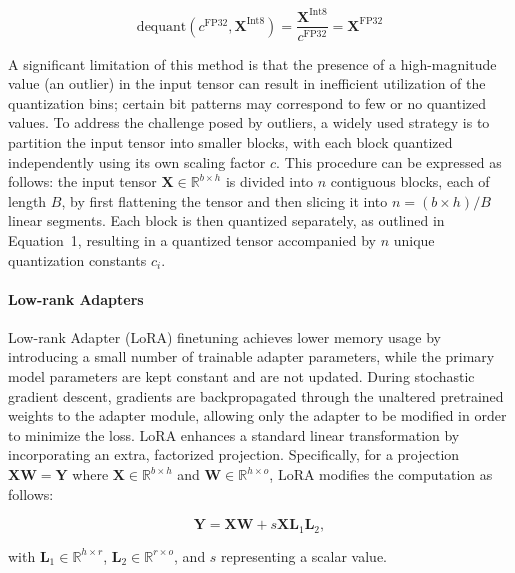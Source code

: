\begin{equation}
    \text{dequant}(c^{\text{FP32}}, \mathbf{X}^{\text{Int8}}) = \frac{\mathbf{X}^{\text{Int8}}}{c^{\text{FP32}}} = \mathbf{X}^{\text{FP32}}
\end{equation}

A significant limitation of this method is that the presence of a high-magnitude value (an outlier) in the input tensor can result in inefficient utilization of the quantization bins; certain bit patterns may correspond to few or no quantized values. To address the challenge posed by outliers, a widely used strategy is to partition the input tensor into smaller blocks, with each block quantized independently using its own scaling factor $c$. This procedure can be expressed as follows: the input tensor $\mathbf{X}\in \mathbb{R}^{b\times h}$ is divided into $n$ contiguous blocks, each of length $B$, by first flattening the tensor and then slicing it into ${n = ({b\times h} )/{B} }$ linear segments. Each block is then quantized separately, as outlined in Equation~1, resulting in a quantized tensor accompanied by $n$ unique quantization constants $c_i$.

\paragraph{Low-rank Adapters} Low-rank Adapter (LoRA) finetuning \citep{hu2021lora} achieves lower memory usage by introducing a small number of trainable adapter parameters, while the primary model parameters are kept constant and are not updated. During stochastic gradient descent, gradients are backpropagated through the unaltered pretrained weights to the adapter module, allowing only the adapter to be modified in order to minimize the loss. LoRA enhances a standard linear transformation by incorporating an extra, factorized projection. Specifically, for a projection ${\mathbf{X} \mathbf{W} = \mathbf{Y}}$ where $\mathbf{X}\in  \mathbb{R}^{b\times h}$ and $\mathbf{W}\in  \mathbb{R}^{h\times o}$, LoRA modifies the computation as follows:

\begin{equation}
    \mathbf{Y} = \mathbf{X}\mathbf{W} + s\mathbf{X}\mathbf{L}_1\mathbf{L}_2,
\end{equation}

with $\mathbf{L}_1 \in \mathbb{R}^{h \times r}$, $\mathbf{L}_2 \in \mathbb{R}^{r \times o}$, and $s$ representing a scalar value.

